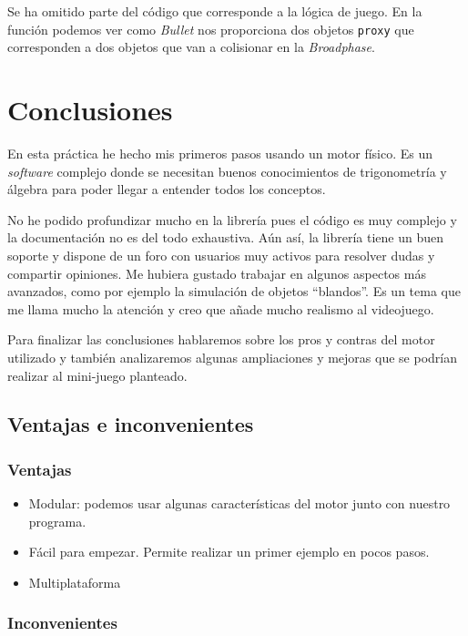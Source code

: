 \documentclass[12pt]{article}
\begin{document}
Se ha omitido parte del código que corresponde a la lógica de juego. En la función podemos ver como \textit{Bullet} nos proporciona dos objetos \texttt{proxy} que corresponden a dos objetos que van a colisionar en la \textit{Broadphase}.

\section{Conclusiones}

En esta práctica he hecho mis primeros pasos usando un motor físico. Es un \textit{software} complejo donde se necesitan buenos conocimientos de trigonometría y álgebra para poder llegar a entender todos los conceptos.

No he podido profundizar mucho en la librería pues el código es muy complejo y la documentación no es del todo exhaustiva. Aún así, la librería tiene un buen soporte y dispone de un foro con usuarios muy activos para resolver dudas y compartir opiniones.
Me hubiera gustado trabajar en algunos aspectos más avanzados, como por ejemplo la simulación de objetos ``blandos''. Es un tema que me llama mucho la atención y creo que añade mucho realismo al videojuego.

Para finalizar las conclusiones hablaremos sobre los pros y contras del motor utilizado y también analizaremos algunas ampliaciones y mejoras que se podrían realizar al mini-juego planteado.

\subsection{Ventajas e inconvenientes}

\subsubsection{Ventajas}

\begin{itemize}
  \item Modular: podemos usar algunas características del motor junto con nuestro programa.
  \item Fácil para empezar. Permite realizar un primer ejemplo en pocos pasos.
  \item Multiplataforma
\end{itemize}

\subsubsection{Inconvenientes}
\end{document}
